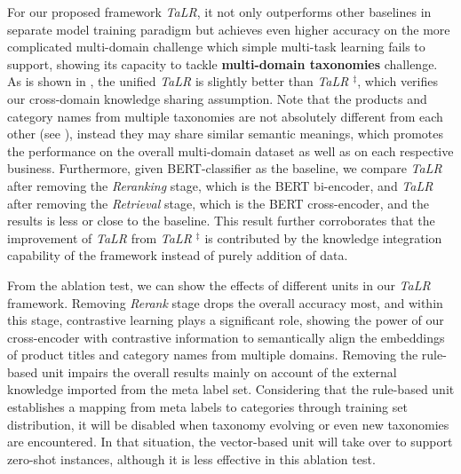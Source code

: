 For our proposed framework \textit{TaLR}, it not only outperforms other baselines in separate model training paradigm but achieves even higher accuracy on the more complicated multi-domain challenge which simple multi-task learning fails to support,
showing its capacity to tackle \textbf{multi-domain taxonomies} challenge. 
As is shown in , the unified \textit{TaLR} is slightly better than \textit{TaLR} $^{\ddagger}$, which
verifies our cross-domain knowledge sharing assumption. Note that the products and category names from multiple taxonomies are not absolutely different from each other (see ), instead they may share similar semantic meanings, which promotes the performance on the overall multi-domain dataset as well as on each respective business. Furthermore, given BERT-classifier as the baseline, we compare \textit{TaLR} after removing the \textit{Reranking} stage, which is the BERT bi-encoder, and \textit{TaLR} after removing the \textit{Retrieval} stage, which is the BERT cross-encoder, and the results is less or close to the baseline. This result further corroborates that the improvement of \textit{TaLR} from \textit{TaLR} $^{\ddagger}$ is contributed by the knowledge integration capability of the framework instead of purely addition of data.

From the ablation test, we can show the effects of different units in our \textit{TaLR} framework. 
Removing \textit{Rerank} stage drops the overall accuracy most, and within this stage, contrastive learning plays a significant role, showing the power of our cross-encoder with contrastive information to semantically align the embeddings of product titles and category names from multiple domains. Removing the rule-based unit impairs the overall results mainly on account of the external knowledge imported from the meta label set. Considering that the rule-based unit establishes a mapping from meta labels to categories through training set distribution, 
it will be disabled when taxonomy evolving or even new taxonomies are encountered. In that situation, the vector-based unit will take over to support zero-shot instances, although it is less effective in this ablation test.

